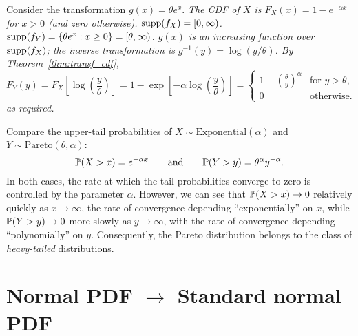 \begin{solution}
Consider the transformation $g(x) = \theta e^x$.
\bit
\it The CDF of $X$ is $F_X(x) = 1 - e^{-\alpha x}$ for $x>0$ (and zero otherwise).
\it $\text{supp}(f_X) = [0,\infty)$.
\it $\text{supp}(f_Y) = \{\theta e^x: x\geq 0\} = [\theta,\infty)$.
\it $g(x)$ is an increasing function over $\text{supp}(f_X)$; the inverse transformation is $g^{-1}(y) = \log(y/\theta)$.
\eit
By Theorem~\ref{thm:transf_cdf},
\[
F_Y(y)
	= F_X\left[\log \left(\frac{y}{\theta}\right)\right]
	= 1 - \exp\left[-\alpha\log \left(\frac{y}{\theta}\right)\right]
	= \begin{cases}
		1 - \displaystyle\left(\frac{\theta}{y}\right)^{\alpha}	& \text{for } y > \theta, \\[2ex]
		0					& \text{otherwise.}
	\end{cases}	
\]
as required.
\end{solution}

\begin{remark}
Compare the upper-tail probabilities of $X\sim\text{Exponential}(\alpha)$ and $Y\sim\text{Pareto}(\theta,\alpha)$:
\[
\mathbb{P}(X > x) = e^{-\alpha x}
\qquad\text{and}\qquad
\mathbb{P}(Y > y) = \theta^{\alpha} y^{-\alpha}.
\]
In both cases, the rate at which the tail probabilities converge to zero is controlled by the parameter $\alpha$. However, we can see that $\mathbb{P}(X>x)\to 0$ relatively quickly as $x\to\infty$, the rate of convergence depending ``exponentially'' on $x$, while $\mathbb{P}(Y>y)\to 0$ more slowly as $y\to\infty$, with the rate of convergence depending ``polynomially'' on $y$.
Consequently, the Pareto distribution belongs to the class of \emph{heavy-tailed} distributions.
\end{remark}

\section{Normal PDF $\longrightarrow$ Standard normal PDF}

